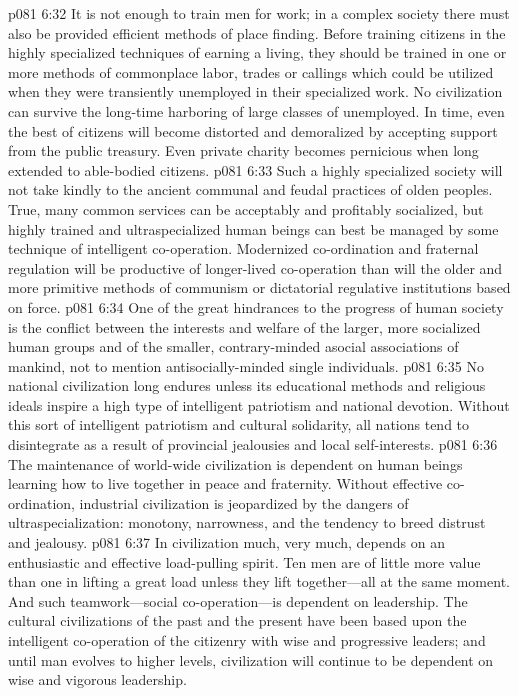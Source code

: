 \vs p081 6:32 It is not enough to train men for work; in a complex society there must also be provided efficient methods of place finding. Before training citizens in the highly specialized techniques of earning a living, they should be trained in one or more methods of commonplace labor, trades or callings which could be utilized when they were transiently unemployed in their specialized work. No civilization can survive the long\hyp{}time harboring of large classes of unemployed. In time, even the best of citizens will become distorted and demoralized by accepting support from the public treasury. Even private charity becomes pernicious when long extended to able\hyp{}bodied citizens.
\vs p081 6:33 Such a highly specialized society will not take kindly to the ancient communal and feudal practices of olden peoples. True, many common services can be acceptably and profitably socialized, but highly trained and ultraspecialized human beings can best be managed by some technique of intelligent co\hyp{}operation. Modernized co\hyp{}ordination and fraternal regulation will be productive of longer\hyp{}lived co\hyp{}operation than will the older and more primitive methods of communism or dictatorial regulative institutions based on force.
\pc \vs p081 6:34 \bibnobreakspace {} One of the great hindrances to the progress of human society is the conflict between the interests and welfare of the larger, more socialized human groups and of the smaller, contrary\hyp{}minded asocial associations of mankind, not to mention antisocially\hyp{}minded single individuals.
\vs p081 6:35 No national civilization long endures unless its educational methods and religious ideals inspire a high type of intelligent patriotism and national devotion. Without this sort of intelligent patriotism and cultural solidarity, all nations tend to disintegrate as a result of provincial jealousies and local self\hyp{}interests.
\vs p081 6:36 The maintenance of world\hyp{}wide civilization is dependent on human beings learning how to live together in peace and fraternity. Without effective co\hyp{}ordination, industrial civilization is jeopardized by the dangers of ultraspecialization: monotony, narrowness, and the tendency to breed distrust and jealousy.
\pc \vs p081 6:37 \bibnobreakspace {} In civilization much, very much, depends on an enthusiastic and effective load\hyp{}pulling spirit. Ten men are of little more value than one in lifting a great load unless they lift together---all at the same moment. And such teamwork---social co\hyp{}operation---is dependent on leadership. The cultural civilizations of the past and the present have been based upon the intelligent co\hyp{}operation of the citizenry with wise and progressive leaders; and until man evolves to higher levels, civilization will continue to be dependent on wise and vigorous leadership.
